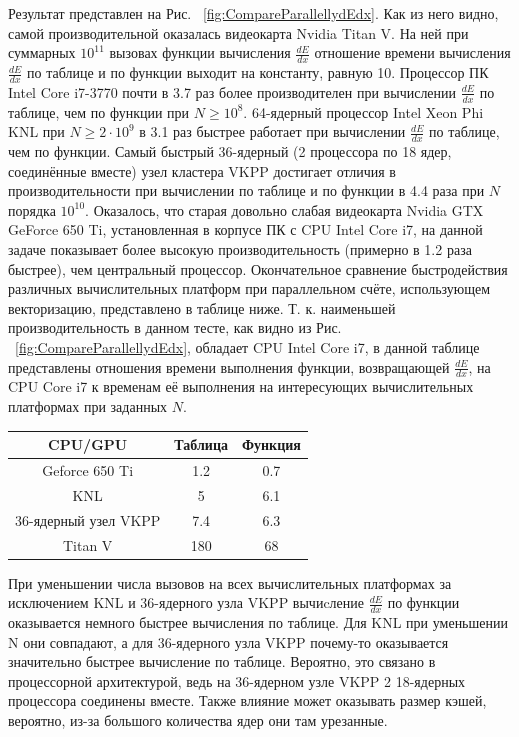\documentclass[a4paper,12pt]{article}
\begin{document}
\begin{large}
	 Результат представлен на Рис. ~\ref{fig:CompareParallellydEdx}.
	 Как из него видно, самой производительной оказалась видеокарта Nvidia Titan V.
	 На ней при суммарных $10^{11}$ вызовах функции вычисления $\frac{dE}{dx}$ отношение времени вычисления $\frac{dE}{dx}$ по таблице и по функции выходит на константу, равную 10.
	 Процессор ПК Intel Core i7-3770 почти в 3.7 раз более производителен при вычислении $\frac{dE}{dx}$ по таблице, чем по функции при $N \geq 10^8$.
	 64-ядерный процессор Intel Xeon Phi KNL при $N \geq 2\cdot 10^9$ в 3.1 раз быстрее работает при вычислении $\frac{dE}{dx}$ по таблице, чем по функции.
	 Самый быстрый 36-ядерный (2 процессора по 18 ядер, соединённые вместе) узел кластера VKPP достигает отличия в производительности при вычислении по таблице и по функции в 4.4 раза при $N$ порядка $10^{10}$.
	 Оказалось, что старая довольно слабая видеокарта Nvidia GTX GeForce 650 Ti, установленная в корпусе ПК с CPU Intel Core i7, на данной задаче показывает более высокую производительность (примерно в 1.2 раза быстрее), чем центральный процессор.
	 Окончательное сравнение быстродействия различных вычислительных платформ при параллельном счёте, использующем векторизацию, представлено в таблице ниже.
	 Т. к. наименьшей производительность в данном тесте, как видно из Рис. ~\ref{fig:CompareParallellydEdx}, обладает CPU Intel Core i7, в данной таблице представлены отношения времени выполнения функции, возвращающей $\frac{dE}{dx}$, на CPU Core i7 к временам её выполнения на интересующих вычислительных платформах при заданных $N$.
	 
	 \begin{tabular}{|c|c|c|}
	 \hline 
	 CPU/GPU & Таблица & Функция \\ 
	 \hline 
	 Geforce 650 Ti & 1.2 & 0.7 \\ 
	 \hline 
	 KNL & 5 & 6.1 \\ 
	 \hline 
	 36-ядерный узел VKPP & 7.4 & 6.3 \\ 
	 \hline 
	 Titan V & 180 & 68 \\ 
	 \hline 
	 \end{tabular} 
	 
	При уменьшении числа вызовов на всех вычислительных платформах за исключением KNL и 36-ядерного узла VKPP вычиcление $\frac{dE}{dx}$ по функции оказывается немного быстрее вычисления по таблице.
	Для KNL при уменьшении N они совпадают, а для 36-ядерного узла VKPP почему-то оказывается значительно быстрее вычисление по таблице.
	Вероятно, это связано в процессорной архитектурой, ведь на 36-ядерном узле VKPP 2 18-ядерных процессора соединены вместе.
	Также влияние может оказывать размер кэшей, вероятно, из-за большого количества ядер они там урезанные.
	

\end{large}
\end{document}
